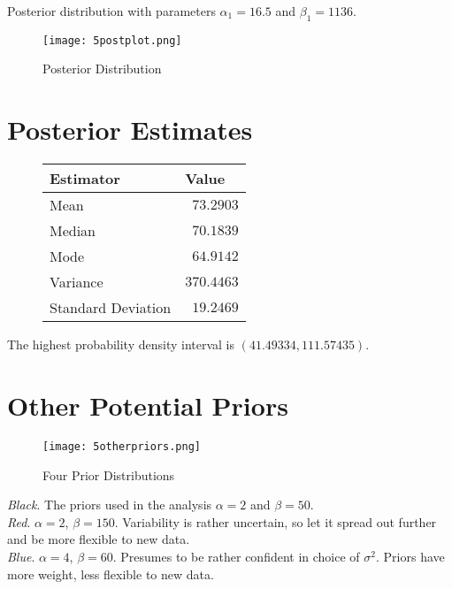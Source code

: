 \documentclass[12pt]{article}
\begin{document}
\noindent Posterior distribution with parameters $\alpha_1=16.5$ and $\beta_1=1136$.

\begin{figure}[H]
\begin{center}
\texttt{[image: 5postplot.png]}
\caption{Posterior Distribution}
\end{center}
\end{figure}

\section*{Posterior Estimates}

\begin{figure}[H]
\begin{center}
\begin{tabular}{l|r}
Estimator & \multicolumn{1}{l}{Value} \\ \hline \hline
Mean & $73.2903$ \\
Median & $70.1839$ \\
Mode & $64.9142$ \\
Variance & $370.4463$ \\
Standard Deviation & $19.2469$ \\
\end{tabular}
\end{center}
\end{figure}

The highest probability density interval is $(41.49334, 111.57435)$.

\section*{Other Potential Priors}

\begin{figure}[H]
\begin{center}
\texttt{[image: 5otherpriors.png]}
\caption{Four Prior Distributions}
\end{center}
\end{figure}

\noindent \textit{Black}.  The priors used in the analysis $\alpha=2$ and $\beta=50$. \\ [-0.3cm]

\noindent \textit{Red}. $\alpha=2$, $\beta=150$.  Variability is rather uncertain, so let it spread out further and be more flexible to new data. \\ [-0.3cm]

\noindent \textit{Blue}. $\alpha=4$, $\beta=60$.  Presumes to be rather confident in choice of $\sigma^2$.  Priors have more weight, less flexible to new data. \\ [-0.3cm]
\end{document}
